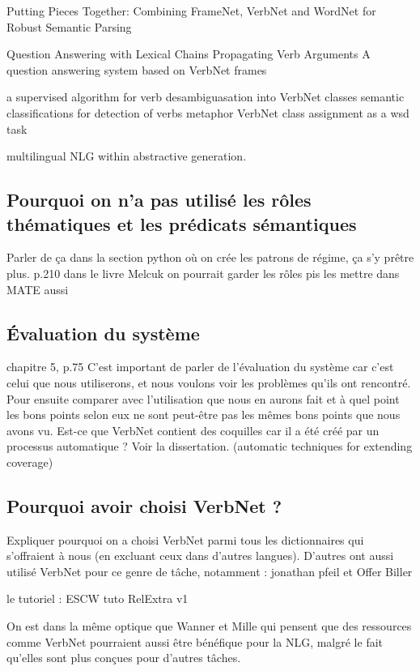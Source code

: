 Putting Pieces Together: Combining FrameNet, VerbNet and WordNet for Robust Semantic Parsing

Question Answering with Lexical Chains Propagating Verb Arguments
A question answering system based on VerbNet frames

a supervised algorithm for verb desambiguasation into VerbNet classes
semantic classifications for detection of verbs metaphor
VerbNet class assignment as a wsd task

multilingual NLG within abstractive generation.

\subsection{Pourquoi on n'a pas utilisé les rôles thématiques et les prédicats sémantiques}

Parler de ça dans la section python où on crée les patrons de régime, ça s'y prêtre plus.
p.210 dans le livre Melcuk
on pourrait garder les rôles pis les mettre dans MATE aussi

\subsection{Évaluation du système}
chapitre 5, p.75 C'est important de parler de l'évaluation du système car c'est celui que nous utiliserons, et nous voulons voir les problèmes qu'ils ont rencontré. Pour ensuite comparer avec l'utilisation que nous en aurons fait et à quel point les bons points selon eux ne sont peut-être pas les mêmes bons points que nous avons vu. Est-ce que VerbNet contient des coquilles car il a été créé par un processus automatique ? Voir la dissertation. (automatic techniques for extending coverage)

\subsection{Pourquoi avoir choisi VerbNet ?}

Expliquer pourquoi on a choisi VerbNet parmi tous les dictionnaires qui s'offraient à nous (en excluant ceux dans d'autres langues).
D'autres ont aussi utilisé VerbNet pour ce genre de tâche, notamment : jonathan pfeil et Offer Biller

le tutoriel : ESCW tuto RelExtra v1	

On est dans la même optique que Wanner et Mille qui pensent que des ressources comme VerbNet pourraient aussi être bénéfique pour la NLG, malgré le fait qu'elles sont plus conçues pour d'autres tâches.



